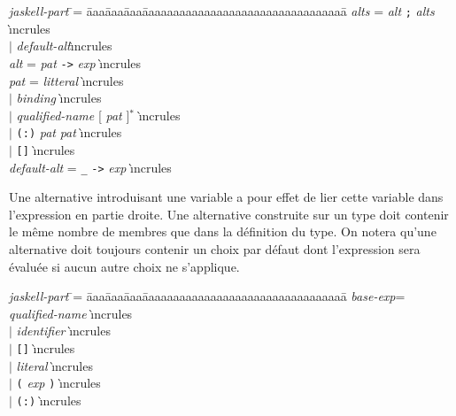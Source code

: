 \begin{mytab}
\emph{jaskell-part} \= \twocol= \=aaa\=aaa\=aaa\=aaaaaaaaaaaaaaaaaaaaaaaaaaaaaaaaa\=\kill
\emph{alts} \>\twocol=\>  \emph{alt}  \texttt{;} \emph{alts} \`{\i}ncrules \\
\> $\mid$ \> \emph{default-alt}\`{\i}ncrules \\
\emph{alt} \>\twocol=\> \emph{pat} \texttt{->} \emph{exp} \`{\i}ncrules \\
\emph{pat}  \>\twocol=\> \emph{litteral} \`{\i}ncrules \\
\> $\mid$ \> \emph{binding} \`{\i}ncrules \\
\> $\mid$ \> \emph{qualified-name} [ \emph{pat}  ]$^*$ \`{\i}ncrules \\
\> $\mid$ \> \texttt{(:)} \emph{pat} \emph{pat} \`{\i}ncrules \\
\> $\mid$ \> \texttt{[]} \`{\i}ncrules \\
\emph{default-alt} \>\twocol=\> \texttt{\_} \texttt{->} \emph{exp} \`{\i}ncrules \\
\end{mytab}

Une alternative introduisant une variable a pour effet de lier cette
variable dans l'expression en partie droite. Une alternative
construite sur un type doit contenir le m\^eme nombre de membres que
dans la d\'efinition du type. On notera qu'une alternative doit toujours
contenir un choix par d\'efaut dont l'expression sera \'evalu\'ee si aucun
autre choix ne s'applique. 

\begin{mytab}
\emph{jaskell-part} \= \twocol= \=aaa\=aaa\=aaa\=aaaaaaaaaaaaaaaaaaaaaaaaaaaaaaaaa\=\kill
\emph{base-exp}\>\twocol=\> \emph{qualified-name} 
\`{\i}ncrules \\
\> $\mid$ \> \emph{identifier}  \`{\i}ncrules \\
\> $\mid$ \> \texttt{[]}  \`{\i}ncrules \\
\> $\mid$ \> \emph{literal}  \`{\i}ncrules \\
\> $\mid$ \> \texttt{(} \emph{exp} \texttt{)}  \`{\i}ncrules \\
\> $\mid$ \> \texttt{(:)}  \`{\i}ncrules \\
\end{mytab}


